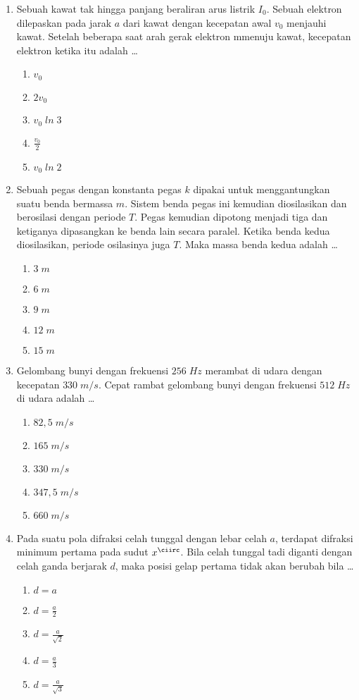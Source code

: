 \documentclass[A4,12PT, english, twocolumn]{journal}
\begin{document}
\begin{enumerate}
\item Sebuah kawat tak hingga panjang beraliran arus listrik $I_0$. Sebuah elektron dilepaskan pada jarak $a$ dari kawat dengan kecepatan awal $v_0$ menjauhi kawat. Setelah beberapa saat arah gerak elektron mmenuju kawat, kecepatan elektron ketika itu adalah \dots
    \begin{enumerate}
        \item $v_0$
        \item $2v_0$
        \item $v_0 \; ln \; 3$
        \item $\frac{v_0}{2}$
        \item $v_0 \; ln \; 2$
    \end{enumerate}
    
\item Sebuah pegas dengan  konstanta pegas $k$ dipakai untuk menggantungkan suatu benda bermassa $m$. Sistem benda pegas ini kemudian diosilasikan dan berosilasi dengan periode $T$. Pegas kemudian dipotong menjadi tiga dan ketiganya dipasangkan ke benda lain secara paralel. Ketika benda kedua diosilasikan, periode osilasinya juga $T$. Maka massa benda kedua adalah \dots
    \begin{enumerate}
        \item $3 \; m$
        \item $6 \; m$
        \item $9 \; m$
        \item $12 \; m$
        \item $15 \; m$
    \end{enumerate}
    
\item Gelombang bunyi dengan frekuensi $256 \; Hz$ merambat di udara dengan kecepatan $330 \; m/s$. Cepat rambat gelombang bunyi dengan frekuensi $512 \; Hz$ di udara adalah \dots
	\begin{enumerate}
		\item $82,5 \; m/s$
		\item $165 \; m/s$
		\item $330 \; m/s$
		\item $347,5 \; m/s$
		\item $660 \; m/s$
	\end{enumerate}
	
\item Pada suatu pola difraksi celah tunggal dengan lebar celah $a$, terdapat difraksi minimum pertama pada sudut $x^\ciirc$. Bila celah tunggal tadi diganti dengan celah ganda berjarak $d$, maka posisi gelap pertama tidak akan berubah bila \dots
   \begin{enumerate}
        \item $d=a$
        \item $d= \frac{a}{2}$
        \item $d= \frac{a}{\sqrt{2}}$
        \item $d= \frac{a}{3}$
        \item $d= \frac{a}{\sqrt{3}}$
   \end{enumerate}
   

\end{enumerate}
\end{document}
